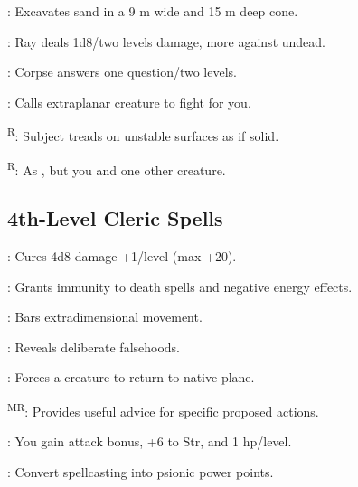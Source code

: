 : Excavates sand in a 9 m wide and 15 m deep cone. %

: Ray deals 1d8/two levels damage, more against undead.

: Corpse answers one question/two levels.


: Calls extraplanar creature to fight for you.

\textsuperscript{R}: Subject treads on unstable surfaces as if solid. %

\textsuperscript{R}: As , but you and one other creature.






\subsection{4th-Level Cleric Spells}



: Cures 4d8 damage +1/level (max +20).

: Grants immunity to death spells and negative energy effects.

: Bars extradimensional movement.

: Reveals deliberate falsehoods.

: Forces a creature to return to native plane.

\textsuperscript{MR}: Provides useful advice for specific proposed actions.

: You gain attack bonus, +6 to Str, and 1 hp/level.

: Convert spellcasting into psionic power points.

